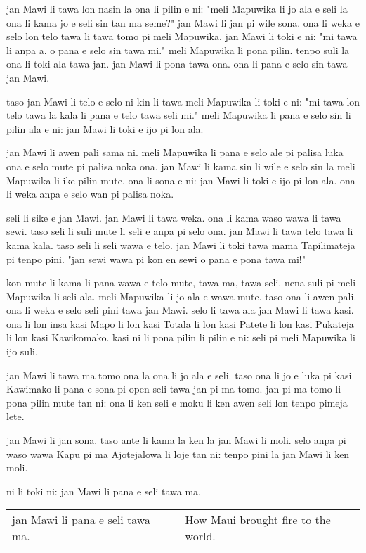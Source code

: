 jan Mawi li tawa lon nasin la ona li pilin e ni: 
"meli Mapuwika li jo ala e seli la ona li kama jo e seli sin tan ma seme?" 
jan Mawi li jan pi wile sona. 
ona li weka e selo lon telo tawa li tawa tomo pi meli Mapuwika.
jan Mawi li toki e ni: "mi tawa li anpa a. 
o pana e selo sin tawa mi."
meli Mapuwika li pona pilin. 
tenpo suli la ona li toki ala tawa jan. 
jan Mawi li pona tawa ona. 
ona li pana e selo sin tawa jan Mawi.

taso jan Mawi li telo e selo ni kin li tawa meli Mapuwika li toki e ni: 
"mi tawa lon telo tawa la kala li pana e telo tawa seli mi."
meli Mapuwika li pana e selo sin li pilin ala e ni: jan Mawi li toki e ijo pi lon ala.

jan Mawi li awen pali sama ni. 
meli Mapuwika li pana e selo ale pi palisa luka ona e selo mute pi palisa noka ona. 
jan Mawi li kama sin li wile e selo sin la meli Mapuwika li ike pilin mute. 
ona li sona e ni: jan Mawi li toki e ijo pi lon ala. 
ona li weka anpa e selo wan pi palisa noka.

seli li sike e jan Mawi. 
jan Mawi li tawa weka. 
ona li kama waso wawa li tawa sewi. 
taso seli li suli mute li seli e anpa pi selo ona. 
jan Mawi li tawa telo tawa li kama kala. 
taso seli li seli wawa e telo. 
jan Mawi li toki tawa mama Tapilimateja pi tenpo pini. 
"jan sewi wawa pi kon en sewi o pana e pona tawa mi!"

kon mute li kama li pana wawa e telo mute, tawa ma, tawa seli.
nena suli pi meli Mapuwika li seli ala. 
meli Mapuwika li jo ala e wawa mute. 
taso ona li awen pali. 
ona li weka e selo seli pini tawa jan Mawi. 
selo li tawa ala jan Mawi li tawa kasi. 
ona li lon insa kasi Mapo li lon kasi Totala li lon kasi Patete li lon kasi Pukateja li lon kasi Kawikomako. 
kasi ni li pona pilin li pilin e ni: seli pi meli Mapuwika li ijo suli.

jan Mawi li tawa ma tomo ona la ona li jo ala e seli. 
taso ona li jo e luka pi kasi Kawimako li pana e sona pi open seli tawa jan pi ma tomo.   
jan pi ma tomo li pona pilin mute tan ni: ona li ken seli e moku li ken awen seli lon tenpo pimeja lete.

jan Mawi li jan sona. 
taso ante li kama la ken la jan Mawi li moli. 
selo anpa pi waso wawa Kapu pi ma Ajotejalowa li loje tan ni: tenpo pini la jan Mawi li ken moli.

ni li toki ni: jan Mawi li pana e seli tawa ma.

\begin{supertabular}{p{5,5cm}|ll}
jan Mawi li pana e seli tawa ma. && How Maui brought fire to the world. \\
\end{supertabular}

